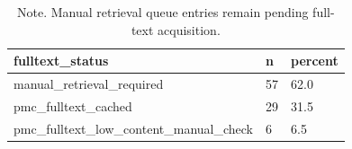 \begin{table}[htbp]
\raggedright
\caption{Stage 3 full-text retrieval status.}
\label{tab.stage3.retrieval}
\begin{tabular}{lll}
\toprule
fulltext\_status & n & percent \\
\midrule
manual\_retrieval\_required & 57 & 62.0 \\
pmc\_fulltext\_cached & 29 & 31.5 \\
pmc\_fulltext\_low\_content\_manual\_check & 6 & 6.5 \\
\bottomrule
\end{tabular}

\caption*{Note. Manual retrieval queue entries remain pending full-text acquisition.}
\end{table}
